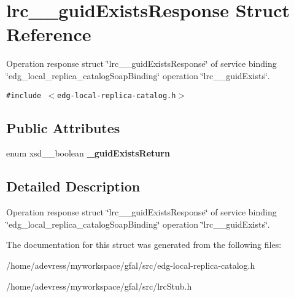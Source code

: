 \section{lrc\_\-\_\-guid\-Exists\-Response Struct Reference}
\label{structlrc____guidExistsResponse}
Operation response struct \char`\"{}lrc\_\-\_\-guid\-Exists\-Response\char`\"{} of service binding \char`\"{}edg\_\-local\_\-replica\_\-catalog\-Soap\-Binding\char`\"{} operation \char`\"{}lrc\_\-\_\-guid\-Exists\char`\"{}.  


{\tt \#include $<$edg-local-replica-catalog.h$>$}

\subsection*{Public Attributes}
\begin{CompactItemize}
\item 
enum xsd\_\-\_\-boolean \textbf{\_\-guid\-Exists\-Return}\label{structlrc____guidExistsResponse_4a1644bc55af9e6052ce61a0213cdca0}

\end{CompactItemize}


\subsection{Detailed Description}
Operation response struct \char`\"{}lrc\_\-\_\-guid\-Exists\-Response\char`\"{} of service binding \char`\"{}edg\_\-local\_\-replica\_\-catalog\-Soap\-Binding\char`\"{} operation \char`\"{}lrc\_\-\_\-guid\-Exists\char`\"{}. 



The documentation for this struct was generated from the following files:\begin{CompactItemize}
\item 
/home/adevress/myworkspace/gfal/src/edg-local-replica-catalog.h\item 
/home/adevress/myworkspace/gfal/src/lrc\-Stub.h\end{CompactItemize}
